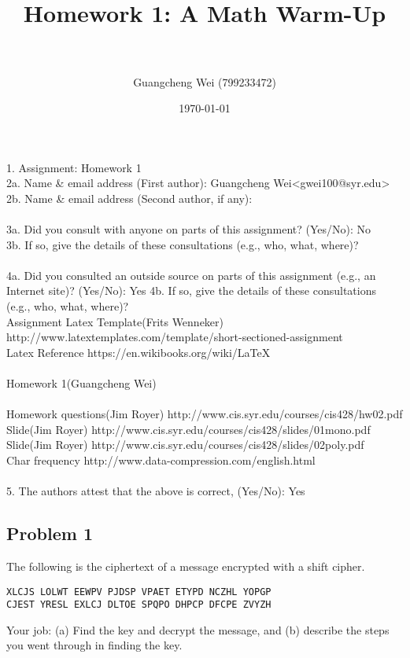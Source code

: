 \documentclass[paper=a4, fontsize=11pt]{scrartcl} %
\title{ 
\horrule{0.5pt} \\[0.4cm] %
\huge Homework 1: A Math Warm-Up \\ %
\horrule{2pt} \\[0.5cm] %
}
\author{Guangcheng Wei (799233472)} %
\date{\normalsize\today} %
\numberwithin{equation}{section} %
\numberwithin{figure}{section} %
\newcommand{\problem}[1]{\subsection *{Problem #1}}
\begin{document}
\maketitle %

1.  Assignment: Homework 1\\

2a. Name \& email address (First author): Guangcheng Wei<gwei100@syr.edu> \\
2b. Name \& email address (Second author, if any):\\
\\
3a. Did you consult with anyone on parts of this assignment? (Yes/No): No\\
3b. If so, give the details of these consultations (e.g., who, what,    where)?\\
\\
4a. Did you consulted an outside source on parts of this assignment     (e.g., an Internet site)?  (Yes/No): Yes
4b. If so, give the details of these consultations (e.g., who, what,     where)?
\\
Assignment Latex Template(Frits Wenneker) http://www.latextemplates.com/template/short-sectioned-assignment\\
Latex Reference https://en.wikibooks.org/wiki/LaTeX\\
\\
Homework 1(Guangcheng Wei)\\
\\
Homework questions(Jim Royer) http://www.cis.syr.edu/courses/cis428/hw02.pdf\\
Slide(Jim Royer) http://www.cis.syr.edu/courses/cis428/slides/01mono.pdf\\
Slide(Jim Royer) http://www.cis.syr.edu/courses/cis428/slides/02poly.pdf\\
Char frequency http://www.data-compression.com/english.html\\
\\
5.  The authors attest that the above is correct, (Yes/No): Yes\\

\pagebreak
\problem 1 The following is the ciphertext of a message encrypted with a shift
cipher.
\begin{lstlisting}
XLCJS LOLWT EEWPV PJDSP VPAET ETYPD NCZHL YOPGP
CJEST YRESL EXLCJ DLTOE SPQPO DHPCP DFCPE ZVYZH
\end{lstlisting}
Your job: (a) Find the key and decrypt the message, and (b) describe
the steps you went through in finding the key.\\\\
\end{document}
